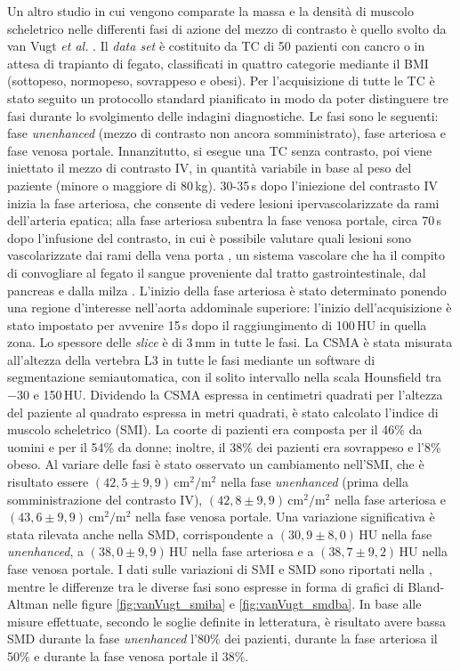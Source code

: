 Un altro studio in cui vengono comparate la massa e la densità di muscolo scheletrico nelle differenti fasi di azione del mezzo di contrasto è quello svolto da van Vugt \textit{et al.} \cite{vanVugt2018}. Il \textit{data set} è costituito da TC di 50 pazienti con cancro o in attesa di trapianto di fegato, classificati in quattro categorie mediante il BMI (sottopeso, normopeso, sovrappeso e obesi). Per l’acquisizione di tutte le TC è stato seguito un protocollo standard pianificato in modo da poter distinguere tre fasi durante lo svolgimento delle indagini diagnostiche. Le fasi sono le seguenti: fase \textit{unenhanced} (mezzo di contrasto non ancora somministrato), fase arteriosa e fase venosa portale. Innanzitutto, si esegue una TC senza contrasto, poi viene iniettato il mezzo di contrasto IV, in quantità variabile in base al peso del paziente (minore o maggiore di 80\,kg). 30-35\,s dopo l’iniezione del contrasto IV inizia la fase arteriosa, che consente di vedere lesioni ipervascolarizzate da rami dell'arteria epatica; alla fase arteriosa subentra la fase venosa portale, circa 70\,s dopo l’infusione del contrasto, in cui è possibile valutare quali lesioni sono vascolarizzate dai rami della vena porta \cite{passariello}, un sistema vascolare che ha il compito di convogliare al fegato il sangue proveniente dal tratto gastrointestinale, dal pancreas e dalla milza \cite{porta}. L’inizio della fase arteriosa è stato determinato ponendo una regione d’interesse nell'aorta addominale superiore: l’inizio dell'acquisizione è stato impostato per avvenire 15\,s dopo il raggiungimento di 100\,HU in quella zona. Lo spessore delle \textit{slice} è di 3\,mm in tutte le fasi. La CSMA è stata misurata all'altezza della vertebra L3 in tutte le fasi mediante un software di segmentazione semiautomatica, con il solito intervallo nella scala Hounsfield tra $-30$ e 150\,HU. Dividendo la CSMA espressa in centimetri quadrati per l’altezza del paziente al quadrato espressa in metri quadrati, è stato calcolato l’indice di muscolo scheletrico (SMI). La coorte di pazienti era composta per il 46\% da uomini e per il 54\% da donne; inoltre, il 38\% dei pazienti era sovrappeso e l’8\% obeso. Al variare delle fasi è stato osservato un cambiamento nell’SMI, che è risultato essere $(42,5 \pm 9,9)\,\text{cm}^2/\text{m}^2$ nella fase \textit{unenhanced} (prima della somministrazione del contrasto IV), $(42,8 \pm 9,9)\,\text{cm}^2/\text{m}^2$ nella fase arteriosa e $(43,6 \pm 9,9)\,\text{cm}^2/\text{m}^2$ nella fase venosa portale. Una variazione significativa è stata rilevata anche nella SMD, corrispondente a $(30,9 \pm 8,0)$\,HU nella fase \textit{unenhanced}, a $(38,0 \pm 9,9)$\,HU nella fase arteriosa e a $(38,7 \pm 9,2)$\,HU nella fase venosa portale. I dati sulle variazioni di SMI e SMD sono riportati nella , mentre le differenze tra le diverse fasi sono espresse in forma di grafici di Bland-Altman nelle figure \ref{fig:vanVugt_smiba} e \ref{fig:vanVugt_smdba}. In base alle misure effettuate, secondo le soglie definite in letteratura, è risultato avere bassa SMD durante la fase \textit{unenhanced} l’80\% dei pazienti, durante la fase arteriosa il 50\% e durante la fase venosa portale il 38\%.

